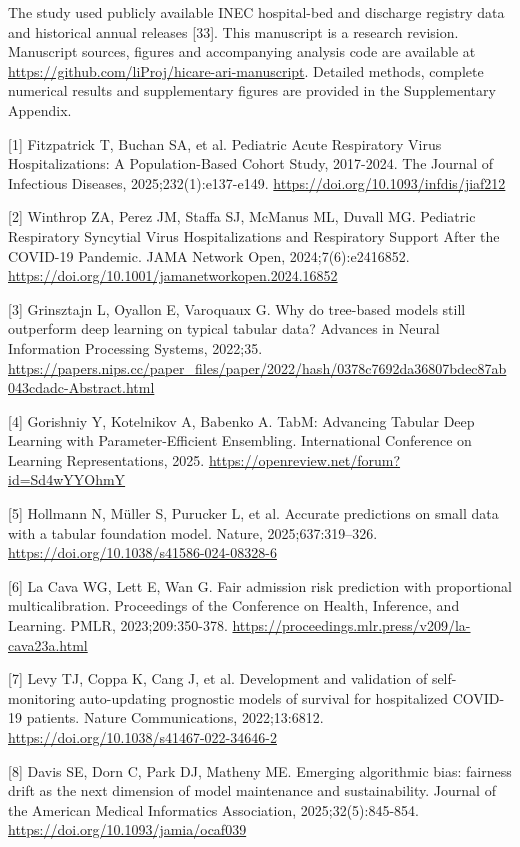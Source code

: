 \documentclass[11pt,a4paper]{article}
\newcommand{\mainheading}[1]{\par\needspace{4\baselineskip}\vspace{7pt}{\large\bfseries #1}\par\vspace{3pt}}
\newcommand{\subheading}[1]{\par\needspace{3\baselineskip}\vspace{5pt}{\bfseries #1}\par\vspace{1pt}}
\begin{document}
\subheading{Data sources and study declarations}
The study used publicly available INEC hospital-bed and discharge registry data and historical annual releases [33]. This manuscript is a research revision. Manuscript sources, figures and accompanying analysis code are available at \url{https://github.com/liProj/hicare-ari-manuscript}. Detailed methods, complete numerical results and supplementary figures are provided in the Supplementary Appendix.

\clearpage
\mainheading{References}
{\small [1] Fitzpatrick T, Buchan SA, et al. Pediatric Acute Respiratory Virus Hospitalizations: A Population-Based Cohort Study, 2017-2024. The Journal of Infectious Diseases, 2025;232(1):e137-e149. \url{https://doi.org/10.1093/infdis/jiaf212}\par}
{\small [2] Winthrop ZA, Perez JM, Staffa SJ, McManus ML, Duvall MG. Pediatric Respiratory Syncytial Virus Hospitalizations and Respiratory Support After the COVID-19 Pandemic. JAMA Network Open, 2024;7(6):e2416852. \url{https://doi.org/10.1001/jamanetworkopen.2024.16852}\par}
{\small [3] Grinsztajn L, Oyallon E, Varoquaux G. Why do tree-based models still outperform deep learning on typical tabular data? Advances in Neural Information Processing Systems, 2022;35. \url{https://papers.nips.cc/paper_files/paper/2022/hash/0378c7692da36807bdec87ab043cdadc-Abstract.html}\par}
{\small [4] Gorishniy Y, Kotelnikov A, Babenko A. TabM: Advancing Tabular Deep Learning with Parameter-Efficient Ensembling. International Conference on Learning Representations, 2025. \url{https://openreview.net/forum?id=Sd4wYYOhmY}\par}
{\small [5] Hollmann N, Müller S, Purucker L, et al. Accurate predictions on small data with a tabular foundation model. Nature, 2025;637:319–326. \url{https://doi.org/10.1038/s41586-024-08328-6}\par}
{\small [6] La Cava WG, Lett E, Wan G. Fair admission risk prediction with proportional multicalibration. Proceedings of the Conference on Health, Inference, and Learning. PMLR, 2023;209:350-378. \url{https://proceedings.mlr.press/v209/la-cava23a.html}\par}
{\small [7] Levy TJ, Coppa K, Cang J, et al. Development and validation of self-monitoring auto-updating prognostic models of survival for hospitalized COVID-19 patients. Nature Communications, 2022;13:6812. \url{https://doi.org/10.1038/s41467-022-34646-2}\par}
{\small [8] Davis SE, Dorn C, Park DJ, Matheny ME. Emerging algorithmic bias: fairness drift as the next dimension of model maintenance and sustainability. Journal of the American Medical Informatics Association, 2025;32(5):845-854. \url{https://doi.org/10.1093/jamia/ocaf039}\par}
\end{document}
